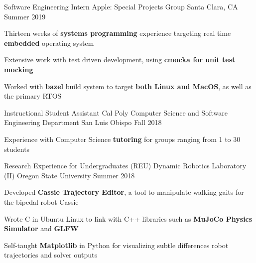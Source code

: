 

\begin{cventries}

  
  \cventry
    {Software Engineering Intern} %
    {Apple: Special Projects Group} %
    {Santa Clara, CA} %
    {Summer 2019} %
    {
      \begin{cvitems} %
      \item {Thirteen weeks of \textbf{systems programming} experience targeting real time \textbf{embedded} operating system}
      \item {Extensive work with test driven development, using \textbf{cmocka for unit test mocking}}
      \item {Worked with \textbf{bazel} build system to target \textbf{both Linux and MacOS}, as well as the primary RTOS}
      \end{cvitems}
    }

  \cventry
    {Instructional Student Assistant} %
    {Cal Poly Computer Science and Software Engineering Department} %
    {San Luis Obispo} %
    {Fall 2018} %
    {
      \begin{cvitems} %
        \item {Experience with Computer Science \textbf{tutoring} for groups ranging from 1 to 30 students}      
      \end{cvitems}
    }
  


  \cventry
    {Research Experience for Undergraduates (REU)} %
    {Dynamic Robotics Laboratory (II)} %
    {Oregon State University} %
    {Summer 2018} %
    {
      \begin{cvitems} %
        \item {Developed \textbf{Cassie Trajectory Editor}, a tool to manipulate walking gaits for the bipedal robot Cassie}
        \item {Wrote C in Ubuntu Linux to link with C++ libraries such as \textbf{MuJoCo Physics Simulator} and \textbf{GLFW}}
        \item {Self-taught \textbf{Matplotlib} in Python for visualizing subtle differences robot trajectories and solver outputs}
      \end{cvitems}
    }
  



\end{cventries}
